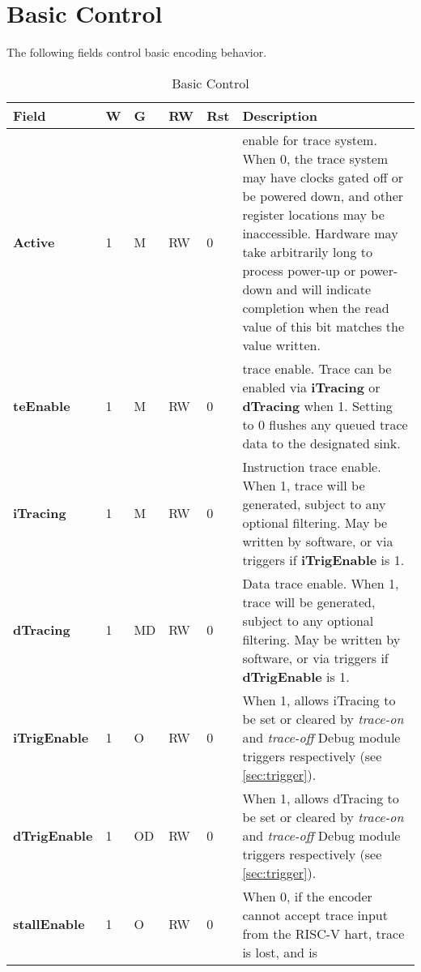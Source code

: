 \section{Basic Control} \label{sec:ctl-basic}

The following fields control basic encoding behavior.

\begin{table}[htp]
  \centering
  \caption{Basic Control}
  \label{tab:ctl-basic}
  \begin{tabulary}{\textwidth}{|l|l|l|l|l|p{90mm}|}
    \hline
    {\bf Field} & {\bf W} & {\bf G} & {\bf RW} & {\bf Rst} & {\bf Description} \\
    \hline
    \textbf{Active} & 1 & M & RW & 0 & {\color{red}{Primary}} enable for trace system.  When 0, the trace system may have clocks gated off or be powered down,
     and other register locations may be inaccessible.
      Hardware may take arbitrarily long to process power-up or power-down and will indicate completion when the read value of this bit
      matches the value written.\\
    \hline
    \textbf{teEnable} & 1 & M & RW & 0 & 
      {\color{red}{Primary}} trace enable.  Trace can be enabled via \textbf{iTracing}
      or \textbf{dTracing} when 1. Setting to 0 flushes any queued trace data to the designated sink.\\
    \hline
    \textbf{iTracing} & 1 & M & RW & 0 & Instruction trace enable.  When 1, trace will be generated,
       subject to any optional filtering.  May be written by software, or via triggers if \textbf{iTrigEnable} is 1.  \\
    \hline
    \textbf{dTracing} & 1 & MD & RW & 0 & Data trace enable.  When 1, trace will be generated,
       subject to any optional filtering.  May be written by software, or via triggers if \textbf{dTrigEnable} is 1.  \\
    \hline
    \textbf{iTrigEnable} & 1 & O & RW & 0 & When 1, allows iTracing to be set or cleared by \textit{trace-on} and \textit{trace-off} 
      Debug module triggers respectively (see \ref{sec:trigger}).\\
    \hline
    \textbf{dTrigEnable} & 1 & OD & RW & 0 & When 1, allows dTracing to be set or cleared by \textit{trace-on} and \textit{trace-off} 
      Debug module triggers respectively (see \ref{sec:trigger}).\\
    \hline
    \textbf{stallEnable} & 1 & O & RW & 0 & When 0, if the encoder cannot accept trace input from the RISC-V hart, trace is lost, and is

\end{tabulary}
\end{table}
